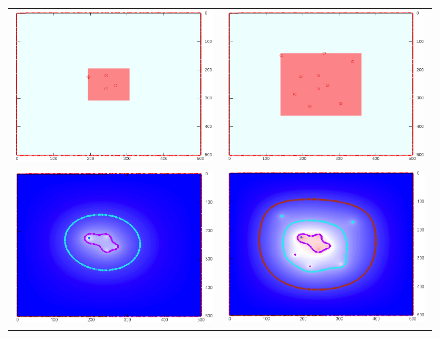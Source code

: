 \begin{refsection}
\newlength\breite
\begin{figure}
\centering
\begin{tabular}{cc}
\includegraphics[width=0.48\hsize]{green/images/resultate/grfl/step0057.png}
& \includegraphics[width=0.48\hsize]{green/images/resultate/grfl/step0111.png}\vspace{1cm}\\
\includegraphics[width=0.48\hsize]{green/images/resultate/cp/step0057.png}
& \includegraphics[width=0.48\hsize]{green/images/resultate/cp/step0111.png}\vspace{1cm}\\

\end{tabular}
\end{figure}
\end{refsection}
